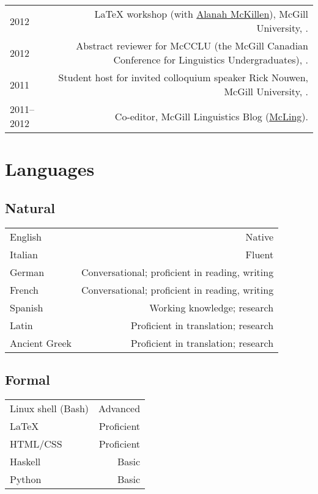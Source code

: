 \documentclass[a4paper]{article}
\makeatletter
\newcommand{\formatdatenoday}[2]{\mydatenoday\formatdate{0}{#1}{#2}}
\newcommand{\myvrule}{\color{lightgray}\vrule width 1.0pt}
\newenvironment{cvsection}{%
  \renewcommand{\arraystretch}{1.75}
  \begin{longtable}[l]{@{} L R @{}}
}{%
  \end{longtable}
}
\makeatother
\begin{document}
\begin{cvsection}
  2012 & \LaTeX{} workshop (with
  \href{http://people.linguistics.mcgill.ca/~alanah.mckillen/}{Alanah
  McKillen}), McGill University, . \\

  2012 & Abstract reviewer for McCCLU (the McGill Canadian Conference for
  Linguistics Undergraduates), \formatdatenoday{1}{2012}. \\

  2011 & Student host for invited colloquium speaker Rick Nouwen, McGill
  University, \formatdatenoday{12}{2011}. \\

  2011--2012 & Co-editor, McGill Linguistics Blog
  (\href{https://blogs.mcgill.ca/mcling/}{McLing}). \\
\end{cvsection}

\section*{Languages}

\vspace{1ex}
\subsection*{Natural}

\begin{cvsection}
  English & Native \\
  Italian & Fluent \\
  German & Conversational; proficient in reading, writing \\
  French & Conversational; proficient in reading, writing \\
  Spanish & Working knowledge; research \\
  Latin & Proficient in translation; research \\
  Ancient Greek & Proficient in translation; research \\
\end{cvsection}

\vspace{-2ex}
\subsection*{Formal}

\begin{cvsection}
  Linux shell {\footnotesize (Bash)} & Advanced \\
  \LaTeX{} & Proficient \\
  HTML/CSS & Proficient \\
  Haskell & Basic \\
  Python & Basic \\
\end{cvsection}
\end{document}
